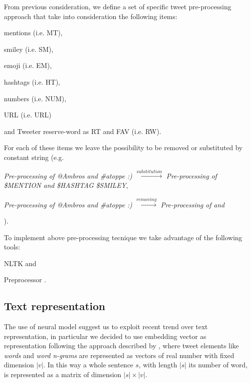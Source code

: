 From previous consideration, we define a set of specific tweet pre-processing approach that take into consideration the following items:
\begin{enumerate*}
\item mentions (i.e. MT),
\item smiley (i.e. SM),
\item emoji (i.e. EM),
\item hashtags (i.e. HT),
\item numbers (i.e. NUM),
\item URL (i.e. URL)
\item and Tweeter reserve-word as RT and FAV (i.e. RW).
\end{enumerate*}

For each of these items we leave the possibility to be removed or substituted by constant string (e.g.
\begin{enumerate*}
\item \emph{Pre-processing of @Ambros and \#atoppe :)} $\xrightarrow{substitution} $ \emph{Pre-processing of \$MENTION and \$HASHTAG \$SMILEY},
\item \emph{Pre-processing of @Ambros and \#atoppe :)} $\xrightarrow{removing} $ \emph{Pre-processing of and}
\end{enumerate*}
).

To implement above pre-processing tecnique we take advantage of the following tools:
\begin{enumerate*}
\item NLTK \cite{nltk} and 
\item Preprocessor \cite{tweets-preprocessor}.
\end{enumerate*}



\subsection{Text representation} \label{subsec:representation}

The use of neural model suggest us to exploit recent trend over text representation, in particular we decided to use embedding vector as representation following the approach described by \cite{bojanowski2016enriching}, where tweet elements like \emph{words} and \emph{word n-grams} are represented as vectors of real number with fixed dimension $|v|$.
In this way a whole sentence $s$, with length $|s|$ its number of word, is represented as a matrix of dimension $|s| \times |v|$.


